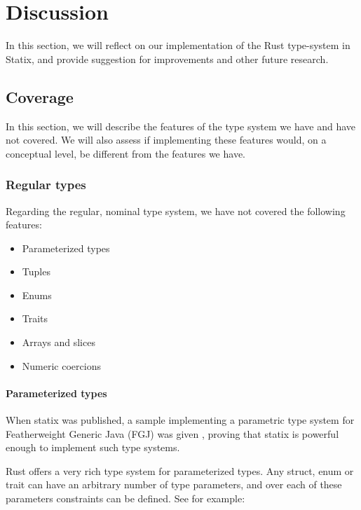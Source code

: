 \section{Discussion}\label{s:discussion}

In this section, we will reflect on our implementation of the Rust type-system in Statix, and provide suggestion for improvements and other future research.

\subsection{Coverage}

In this section, we will describe the features of the type system we have and have not covered. We will also assess if implementing these features would, on a conceptual level, be different from the features we have.

\subsubsection{Regular types}

Regarding the regular, nominal type system, we have not covered the following features:

\begin{itemize}
	\item Parameterized types
	\item Tuples
	\item Enums
	\item Traits
	\item Arrays and slices
	\item Numeric coercions
\end{itemize}

\paragraph{Parameterized types}

When statix was published\cite{antwerpen}, a sample implementing a parametric type system for Featherweight Generic Java (FGJ) was given \cite{statix_reference_impl}, proving that statix is powerful enough to implement such type systems.

Rust offers a very rich type system for parameterized types. Any struct, enum or trait can have an arbitrary number of type parameters, and over each of these\\ parameters constraints can be defined. See for example:

